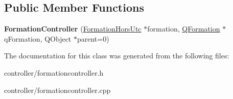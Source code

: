 \subsection*{Public Member Functions}
\begin{DoxyCompactItemize}
\item 
\hypertarget{classFormationController_a0503e366066246aebad060de9dc02c77}{{\bfseries Formation\+Controller} (\hyperlink{classFormationHorsUtc}{Formation\+Hors\+Utc} $\ast$formation, \hyperlink{classQFormation}{Q\+Formation} $\ast$q\+Formation, Q\+Object $\ast$parent=0)}\label{classFormationController_a0503e366066246aebad060de9dc02c77}

\end{DoxyCompactItemize}


The documentation for this class was generated from the following files\+:\begin{DoxyCompactItemize}
\item 
controller/formationcontroller.\+h\item 
controller/formationcontroller.\+cpp\end{DoxyCompactItemize}
